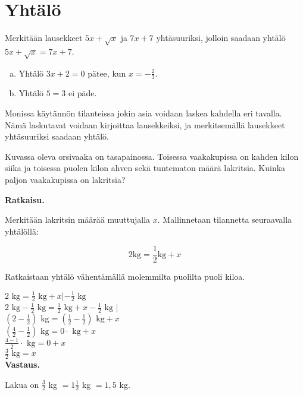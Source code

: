 \chapter{Yhtälö}


\begin{esimerkki}
Merkitään lausekkeet $5x+\sqrt{x}$ ja $7x+7$ yhtäsuuriksi, jolloin saadaan
yhtälö $5x+\sqrt{x} = 7x+7$.
\end{esimerkki}


\begin{esimerkki}
\begin{enumerate}[a)]
\item Yhtälö $3x + 2 = 0$ pätee, kun $x = - \frac{2}{3}$.
\item Yhtälö $5 = 3$ ei päde.
\end{enumerate}
\end{esimerkki}

Monissa käytännön tilanteissa jokin asia voidaan laskea kahdella eri tavalla.
Nämä laskutavat voidaan kirjoittaa lausekkeiksi, ja merkitsemällä lausekkeet yhtäsuuriksi saadaan yhtälö.

\begin{esimerkki}
Kuvassa oleva orsivaaka on tasapainossa. Toisessa vaakakupissa on kahden kilon siika ja toisessa puolen kilon ahven sekä tuntematon määrä lakritsia. Kuinka paljon vaakakupissa on lakritsia?

\textbf{Ratkaisu.}

Merkitään lakritsin määrää muuttujalla $x$. Mallinnetaan tilannetta seuraavalla yhtälöllä:

\begin{equation}
2\text{kg} = \frac{1}{2}\text{kg} + x
\end{equation}

Ratkaistaan yhtälö vähentämällä molemmilta puolilta puoli kiloa.

$2\text{ kg} = \frac{1}{2}\text{ kg} + x | -\frac{1}{2}\text{ kg}$ \\
$2\text{ kg} - \frac{1}{2}\text{ kg} = \frac{1}{2}\text{ kg} + x - \frac{1}{2}\text{ kg}$ |  \\
$(2-\frac{1}{2})\text{ kg} = (\frac{1}{2} - \frac{1}{2})\text{ kg} + x$ \\
$(\frac{4}{2} - \frac{1}{2})\text{ kg} = 0 \cdot \text{ kg} + x$ \\
$ \frac{4-1}{2} \cdot \text{ kg} = 0 + x$ \\
$ \frac{3}{2} \text{ kg} = x$ \\

\textbf{Vastaus.}

Lakua on $\frac{3}{2}$ kg $= 1 \frac{1}{2}$ kg $= 1,5$ kg.
\end{esimerkki}

